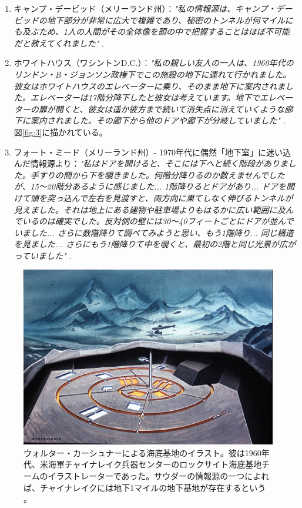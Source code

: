 \documentclass[10pt,twocolumn,letterpaper]{article}
\begin{document}
\begin{flushleft}
\begin{enumerate}
    \item キャンプ・デービッド（メリーランド州）：\textit{"私の情報源は、キャンプ・デービッドの地下部分が非常に広大で複雑であり、秘密のトンネルが何マイルにも及ぶため、1人の人間がその全体像を頭の中で把握することはほぼ不可能だと教えてくれました"} \cite{22}.
    \item ホワイトハウス（ワシントンD.C.）：\textit{"私の親しい友人の一人は、1960年代のリンドン・B・ジョンソン政権下でこの施設の地下に連れて行かれました。彼女はホワイトハウスのエレベーターに乗り、そのまま地下に案内されました。エレベーターは17階分降下したと彼女は考えています。地下でエレベーターの扉が開くと、彼女は遥か彼方まで続いて消失点に消えていくような廊下に案内されました。その廊下から他のドアや廊下が分岐していました"} \cite{22}. 図\ref{fig:3}に描かれている。
    \item フォート・ミード（メリーランド州）- 1970年代に偶然「地下室」に迷い込んだ情報源より：\textit{"私はドアを開けると、そこには下へと続く階段がありました。手すりの間から下を覗きました。何階分降りるのか数えませんでしたが、15～20階分あるように感じました... 1階降りるとドアがあり... ドアを開けて頭を突っ込んで左右を見渡すと、両方向に果てしなく伸びるトンネルが見えました。それは地上にある建物や駐車場よりもはるかに広い範囲に及んでいるのは確実でした。反対側の壁には30～40フィートごとにドアが並んでいました... さらに数階降りて調べてみようと思い、もう1階降り... 同じ構造を見ました... さらにもう1階降りて中を覗くと、最初の2階と同じ光景が広がっていました"} \cite{22}.
\end{enumerate}
\end{flushleft}
\begin{figure}[t]
\begin{center}
   \includegraphics[width=1\linewidth]{undersea.jpg}
\end{center}
   \caption{ウォルター・カーシュナーによる海底基地のイラスト。彼は1960年代、米海軍チャイナレイク兵器センターのロックサイト海底基地チームのイラストレーターであった。サウダーの情報源の一つによれば、チャイナレイクには地下1マイルの地下基地が存在するという \cite{22,23}。}
\label{fig:5}
\label{fig:onecol}
\end{figure}
\end{document}
